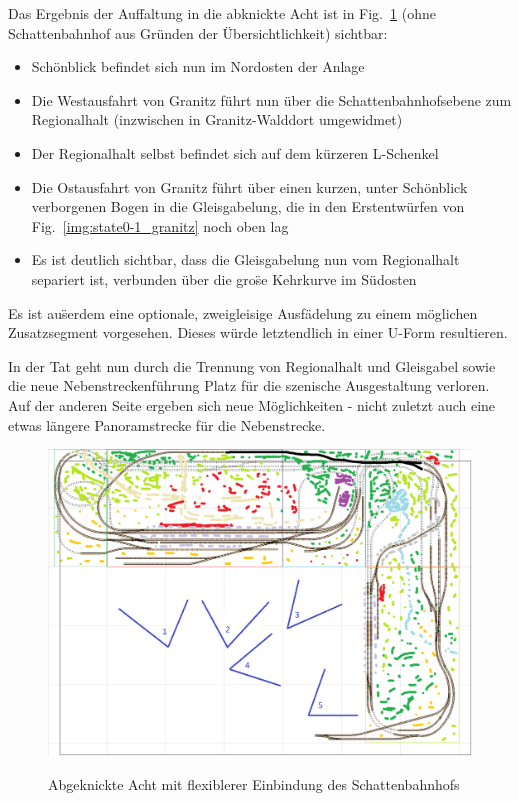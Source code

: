 Das Ergebnis der Auffaltung in die abknickte Acht ist in Fig.~\ref{img:state2_granitz_modules_details} (ohne Schattenbahnhof aus Gr\"unden der \"Ubersichtlichkeit) sichtbar:
\begin{itemize}
	\item Sch\"onblick befindet sich nun im Nordosten der Anlage
	\item Die Westausfahrt von Granitz f\"uhrt nun \"uber die Schattenbahnhofsebene zum Regionalhalt (inzwischen in Granitz-Walddort umgewidmet)
	\item Der Regionalhalt selbst befindet sich auf dem k\"urzeren L-Schenkel
	\item Die Ostausfahrt von Granitz f\"uhrt \"uber einen kurzen, unter Sch\"onblick verborgenen Bogen in die Gleisgabelung, die in den Erstentw\"urfen von Fig.~\ref{img:state0-1_granitz} noch oben lag
	\item Es ist deutlich sichtbar, dass die Gleisgabelung nun vom Regionalhalt separiert ist, verbunden \"uber die gro\"se Kehrkurve im S\"udosten
\end{itemize}

Es ist au\"serdem eine optionale, zweigleisige Ausf\"adelung zu einem m\"oglichen Zusatzsegment vorgesehen.
Dieses w\"urde letztendlich in einer U-Form resultieren.

In der Tat geht nun durch die Trennung von Regionalhalt und Gleisgabel sowie die neue Nebenstreckenf\"uhrung Platz f\"ur die szenische Ausgestaltung verloren.
Auf der anderen Seite ergeben sich neue M\"oglichkeiten - nicht zuletzt auch eine etwas l\"angere Panoramstrecke f\"ur die Nebenstrecke.

\begin{figure}[h]
\centering
  \includegraphics[width=1.0\textwidth]{img/map_evolution/state2_granitz_modules_details.png}
	\label{img:state2_granitz_modules_details}
	\caption{Abgeknickte Acht mit flexiblerer Einbindung des Schattenbahnhofs}
\end{figure}

